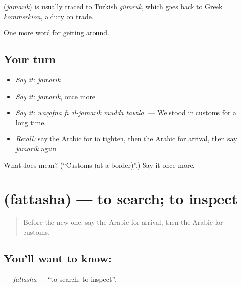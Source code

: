 \begin{cousinweb}
\textbf{} (\emph{jamārik}) is usually traced to Turkish \emph{gümrük}, which goes back to Greek \emph{kommerkion}, a duty on trade.
\end{cousinweb}

\begin{grammarlens}[title={What you've built}]
One more word for getting around.
\end{grammarlens}

\subsection*{Your turn}
\begin{itemize}
\raggedright
  \item \emph{Say it:} \emph{jamārik}
  \item \emph{Say it:} \emph{jamārik}, once more
  \item \emph{Say it:} \emph{waqafnā fī al-jamārik mudda ṭawīla.} — We stood in customs for a long time.
  \item \emph{Recall:} say the Arabic for to tighten, then the Arabic for arrival, then say \emph{jamārik} again
\end{itemize}

\begin{tcolorbox}[breakable,colback=teal!4,colframe=teal!35!black,title={Before you move on}]
What does  mean? (\textquotedblleft{}Customs (at a border)\textquotedblright{}.) Say it once more.
\end{tcolorbox}
\section[\texorpdfstring{\ar{فتش} (fattasha)}{فتش (fattasha)}]{ (fattasha) — to search; to inspect}

\label{lesson:AR-C426-fattasha}



\begin{quote}
Before the new one: say the Arabic for arrival, then the Arabic for customs.
\end{quote}

\subsection*{You'll want to know: }
\textbf{} — \emph{fattasha} — \textquotedblleft{}to search; to inspect\textquotedblright{}.

